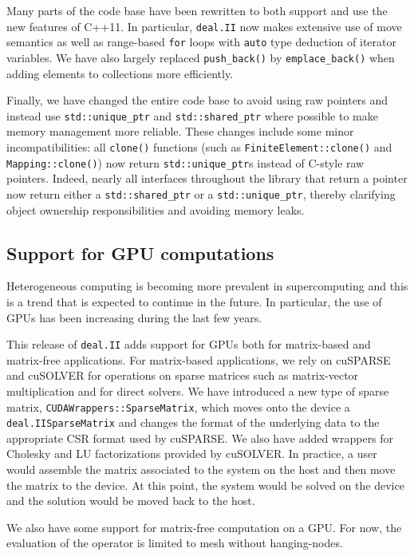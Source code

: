 \documentclass{ansarticle-preprint}
\newcommand{\specialword}[1]{\texttt{#1}}
\newcommand{\dealii}{{\specialword{deal.II}}\xspace}
\begin{document}
Many parts of the code base have been rewritten to both support and
use the new features of C++11. In particular, \dealii now makes
extensive use of move semantics as well as range-based \texttt{for}
loops with \texttt{auto} type deduction of iterator variables. We have
also largely replaced \texttt{push\_back()} by
\texttt{emplace\_back()} when adding elements to collections more
efficiently.

Finally, we have changed the entire code base to avoid using raw
pointers and instead use \texttt{std::unique\_ptr} and
\texttt{std::shared\_ptr} where possible to make memory management
more reliable. These changes include some minor incompatibilities: all
\texttt{clone()} functions (such as \texttt{FiniteElement::clone()} and
\texttt{Mapping::clone()}) now return \texttt{std::unique\_ptr}s instead of
C-style raw pointers. Indeed, nearly all interfaces throughout the library that return a pointer
now return either a \texttt{std::shared\_ptr} or a \texttt{std::unique\_ptr},
thereby clarifying object ownership responsibilities and avoiding memory leaks.


\subsection{Support for GPU computations}

Heterogeneous computing is becoming more prevalent in supercomputing and this is
a trend that is expected to continue in the future. In particular, the use of
GPUs has been increasing during the last few years.

This release of \dealii adds support for GPUs both for matrix-based and
matrix-free applications. For matrix-based applications, we rely on
cuSPARSE\cite{cusparse} and cuSOLVER\cite{cusolver} for operations on sparse
matrices such as matrix-vector multiplication and for direct solvers. We have
introduced a new type of sparse matrix, \texttt{CUDAWrappers::SparseMatrix},
which moves onto the device a \dealii \texttt{SparseMatrix} and changes the
format of the underlying data to the appropriate CSR format used by cuSPARSE. We
also have added wrappers for Cholesky and LU factorizations provided by
cuSOLVER. In practice, a user would assemble the matrix associated to the system
on the host and then move the matrix to the device. At this point, the system
would be solved on the device and the solution would be moved back to the host.

We also have some support for matrix-free computation on a GPU. For now, the
evaluation of the operator is limited to mesh without hanging-nodes.
\end{document}
